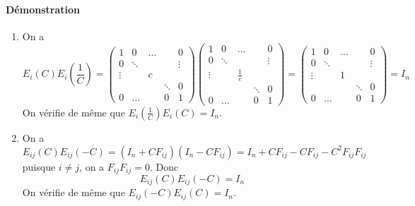\paragraph{Démonstration}
\begin{enumerate}
  \item On a
    $$E_i(C)E_i(\frac{1}{C}) = 
      \begin{pmatrix}
        1 & 0 & \dots & & 0 \\
        0 & \ddots & & & \vdots \\
        \vdots & & c \\
        & & & \ddots & 0 \\
        0 & \dots & & 0 & 1
      \end{pmatrix} 
      \begin{pmatrix}
        1 & 0 & \dots & & 0 \\
        0 & \ddots & & & \vdots \\
        \vdots & & \frac{1}{c} \\
        & & & \ddots & 0 \\
        0 & \dots & & 0 & 1
      \end{pmatrix} = 
      \begin{pmatrix}
        1 & 0 & \dots & & 0 \\
        0 & \ddots & & & \vdots \\
        \vdots & & 1 \\
        & & & \ddots & 0 \\
       0 &\dots & & 0 & 1
      \end{pmatrix} = I_n$$
    On vérifie de même que $E_i(\frac{1}{C}) E_i(C) = I_n$.
  
  \item On a
    $$E_{i j}(C) E_{i j}(-C) = (I_n + C F_{i j}) (I_n - C F_{i j}) = I_n + C F_{i j} - C F_{i j} - C^2 F_{i j} F_{i j}$$
    puisque $i\neq j$, on a $F_{i j} F_{i j} = 0$. Donc
    $$E_{i j}(C) E_{i j}(-C) = I_n$$
    On vérifie de même que $E_{i j}(-C) E_{i j}(C) = I_n$.
  

\end{enumerate}
